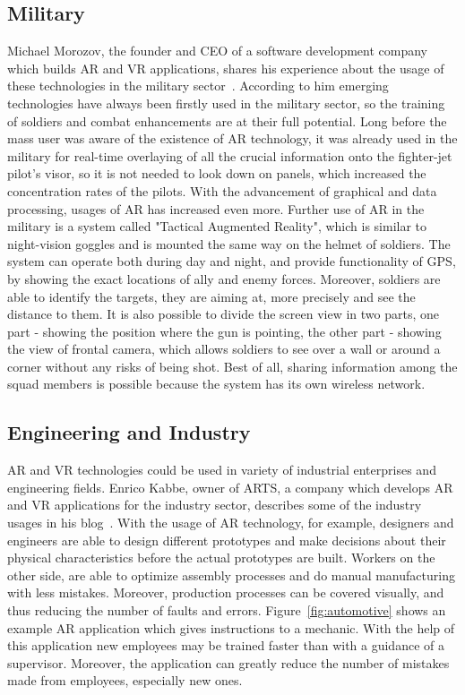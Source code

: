 \documentclass[12pt]{article}
\begin{document}
\subsection{Military} \label{sec:Military}
Michael Morozov, the founder and CEO of a software development company which builds \ac{AR} and \ac{VR} applications, shares his experience about the usage of these technologies in the military sector~\cite{military}. According to him emerging technologies have always been firstly used in the military sector, so the training of soldiers and combat enhancements are at their full potential. Long before the mass user was aware of the existence of \ac{AR} technology, it was already used in the military for real-time overlaying of all the crucial information onto the fighter-jet pilot's visor, so it is not needed to look down on panels, which increased the concentration rates of the pilots. With the advancement of graphical and data processing, usages of \ac{AR} has increased even more. Further use of \ac{AR} in the military is a system called "Tactical Augmented Reality", which is similar to night-vision goggles and is mounted the same way on the helmet of soldiers. The system can operate both during day and night, and provide functionality of \ac{GPS}, by showing the exact locations of ally and enemy forces. Moreover, soldiers are able to identify the targets, they are aiming at, more precisely and see the distance to them. It is also possible to divide the screen view in two parts, one part - showing the position where the gun is pointing, the other part - showing the view of frontal camera, which allows soldiers to see over a wall or around a corner without any risks of being shot. Best of all, sharing information among the squad members is possible because the system has its own wireless network.

\subsection{Engineering and Industry}\label{sec:Engineering and Industry}
\ac{AR} and \ac{VR} technologies could be used in variety of industrial enterprises and engineering fields. Enrico Kabbe, owner of ARTS, a company which develops \ac{AR} and \ac{VR} applications for the industry sector, describes some of the industry usages in his blog~\cite{industry}. With the usage of AR technology, for example, designers and engineers are able to design different prototypes and make decisions about their physical characteristics before the actual prototypes are built. Workers on the other side, are able to optimize assembly processes and do manual manufacturing with less mistakes. Moreover, production processes can be covered visually, and thus reducing the number of faults and errors. Figure~\ref{fig:automotive} shows an example AR application which gives instructions to a mechanic. With the help of this application new employees may be trained faster than with a guidance of a supervisor. Moreover, the application can greatly reduce the number of mistakes made from employees, especially new ones.
\end{document}
